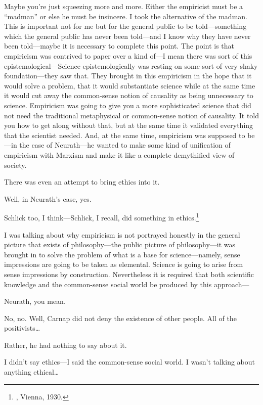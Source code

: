 Maybe you're just squeezing more and more. Either the empiricist 
must be a \enquote{madman} or else he must be insincere. I took the alternative 
of the madman. This is important not for me but for the general public 
to be told---something which the general public has never been 
told---and I know why they have never been told---maybe it is necessary to 
complete this point. The point is that empiricism was contrived to 
paper over a kind of---I mean there was sort of this 
epistemological---Science epistemologically was resting on some sort of very shaky 
foundation---they saw that. They brought in this empiricism in the 
hope that it would solve a problem, that it would substantiate science 
while at the same time it would cut away the common-sense notion of 
causality as being unnecessary to science. Empiricism was going to give 
you a more sophisticated science that did not need the traditional 
metaphysical or common-sense notion of causality. It told you how to 
get along without that, but at the same time it validated everything that 
the scientist needed. And, at the same time, empiricism was supposed to 
be---in the case of Neurath---he wanted to make some kind of unification 
of empiricism with Marxism and make it like a complete demythified view of society. 

 There was even an attempt to bring ethics into it. 

 Well, in Neurath's case, yes. 

 Schlick too, I think---Schlick, I recall, did something in 
ethics.\footnote{, Vienna, 1930.}

 I was talking about why empiricism is not portrayed honestly 
in the general picture that exists of philosophy---the public picture of 
philosophy---it was brought in to solve the problem of what is a base 
for science---namely, sense impressions are going to be taken as 
elemental. Science is going to arise from sense impressions by construction. 
Nevertheless it is required that both scientific knowledge and the 
common-sense social world be produced by this approach--- 

 Neurath, you mean. 

 No, no. Well, Carnap did not deny the existence of other 
people. All of the positivists\ldots

 Rather, he had nothing to say about it. 

 I didn't say ethics---I said the common-sense social world. I 
wasn't talking about anything ethical\ldots


